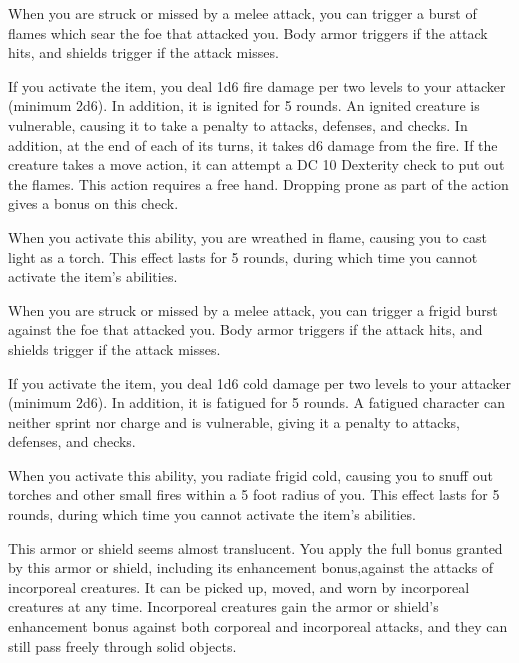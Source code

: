 
 When you are struck or missed by a melee attack, you can trigger a burst of flames which sear the foe that attacked you. Body armor triggers if the attack hits, and shields trigger if the attack misses.

If you activate the item, you deal 1d6 fire damage per two levels to your attacker (minimum 2d6). In addition, it is ignited for 5 rounds. An ignited creature is vulnerable, causing it to take a  penalty to attacks, defenses, and checks. In addition, at the end of each of its turns, it takes d6 damage from the fire. If the creature takes a move action, it can attempt a DC 10 Dexterity check to put out the flames. This action requires a free hand. Dropping prone as part of the action gives a  bonus on this check.

When you activate this ability, you are wreathed in flame, causing you to cast light as a torch. This effect lasts for 5 rounds, during which time you cannot activate the item's abilities.


 When you are struck or missed by a melee attack, you can trigger a frigid burst against the foe that attacked you. Body armor triggers if the attack hits, and shields trigger if the attack misses.

If you activate the item, you deal 1d6 cold damage per two levels to your attacker (minimum 2d6). In addition, it is fatigued for 5 rounds. A fatigued character can neither sprint nor charge and is vulnerable, giving it a  penalty to attacks, defenses, and checks.

When you activate this ability, you radiate frigid cold, causing you to snuff out torches and other small fires within a 5 foot radius of you. This effect lasts for 5 rounds, during which time you cannot activate the item's abilities.


 This armor or shield seems almost translucent. You apply the full bonus granted by this armor or shield, including its enhancement bonus,against the attacks of incorporeal creatures. It can be picked up, moved, and worn by incorporeal creatures at any time. Incorporeal creatures gain the armor or shield's enhancement bonus against both corporeal and incorporeal attacks, and they can still pass freely through solid objects.


